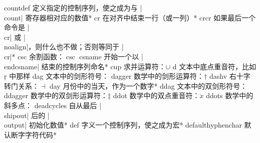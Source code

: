 \capcs countdef {定义指定的控制序列，使之成为与 |\\count| 寄存器相对应的数值}*{}
\capcs cr {在对齐中结束一行（或一列）}*{}
\capcs crcr {如果最后一个命令是 |\\cr| 或 |\\noalign|，则什么也不做；否则等同于 |\\cr|}*{}
\capcs csc {余割函数：$\csc$}{}{}
\capcs csname {开始一个以 |\\endcsname| 结束的控制序列命名}*{}
\capcs cup {求并运算符：$\cup$}{}{}
\capcs d {文本中底点重音符，比如 \d r 中那样}{}{}
\capcs dag {文本中的剑形符号：\dag}{}{}
\capcs dagger {数学中的剑形运算符：$\dagger$}{}{}
\capcs dashv {右十字转门关系：$\dashv$}{}{}
\capcs day {月份中的当天，作为一个数字}*{}
\capcs ddag {文本中的双剑形符号：\ddag}{}{}
\capcs ddagger {数学中的双剑形运算符：$\ddagger$}{}{}
\capcs ddot  {数学中的双点重音符：$\ddot x$}{}{}
\capcs ddots {数学中的斜多点：\smash{$\ddots$}}{}{}
\capcs deadcycles {自从最后 |\\shipout| 后的 |\\output| 初始化数值}*{}
\capcs def {字义一个控制序列，使之成为宏}*{}
\capcs defaulthyphenchar {默认断字字符代码}*{}
